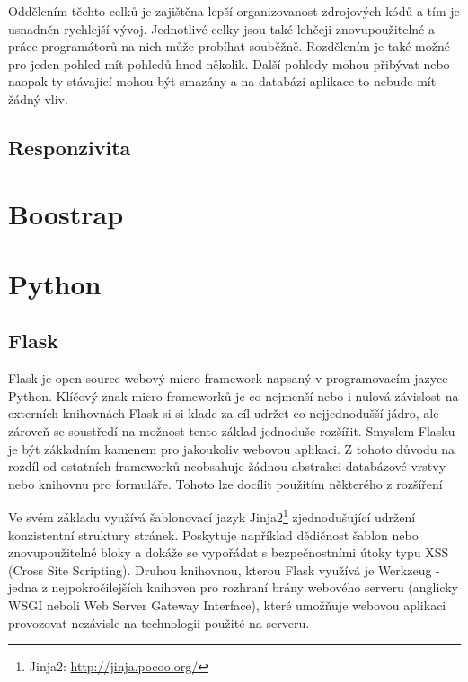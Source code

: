 Oddělením těchto celků je zajištěna lepší organizovanost zdrojových kódů a tím je usnadněn rychlejší vývoj. Jednotlivé celky jsou také lehčeji znovupoužitelné a práce programátorů na nich může probíhat souběžně. Rozdělením je také možné pro jeden pohled mít pohledů hned několik. Další pohledy mohou přibývat nebo naopak ty stávající mohou být smazány a na databázi aplikace to nebude mít žádný vliv.

\subsection{Responzivita}
\blindtext[2]

\section{Boostrap}
\blindtext[2]

\section{Python}
\blindtext[2]

\subsection{Flask}
Flask je open source webový micro-framework napsaný v programovacím jazyce Python. Klíčový znak micro-frameworků je co nejmenší nebo i nulová závislost na externích knihovnách %
Flask si si klade za cíl udržet co nejjednodušší jádro, ale zároveň se soustředí na možnost tento základ jednoduše rozšířit.
Smyslem Flasku je být základním kamenem pro jakoukoliv webovou aplikaci. Z tohoto důvodu na rozdíl od ostatních frameworků neobsahuje žádnou abstrakci databázové vrstvy nebo knihovnu pro formuláře. Tohoto lze docílit použitím některého z rozšíření %

Ve svém základu využívá šablonovací jazyk Jinja2\footnote{Jinja2: \url{http://jinja.pocoo.org/}} zjednodušující udržení konzistentní struktury stránek. Poskytuje například dědičnost šablon nebo znovupoužitelné bloky a dokáže se vypořádat s bezpečnostními útoky typu XSS (Cross Site Scripting). %
Druhou knihovnou, kterou Flask využívá je Werkzeug - jedna z nejpokročilejších knihoven pro rozhraní brány webového serveru (anglicky WSGI neboli Web Server Gateway Interface), které umožňuje webovou aplikaci provozovat nezávisle na technologii použité na serveru. %

